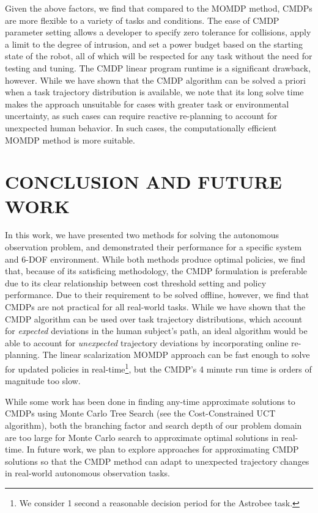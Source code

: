 \documentclass[letterpaper, 10 pt, conference]{ieeeconf}  %
\begin{document}
Given the above factors, we find that compared to the MOMDP method, CMDPs are more flexible to a variety of tasks and conditions.  The ease of CMDP parameter setting allows a developer to specify zero tolerance for collisions, apply a limit to the degree of intrusion, and set a power budget based on the starting state of the robot, all of which will be respected for any task without the need for testing and tuning.  The CMDP linear program runtime is a significant drawback, however.  While we have shown that the CMDP algorithm can be solved a priori when a task trajectory distribution is available, we note that its long solve time makes the approach unsuitable for cases with greater task or environmental uncertainty, as such cases can require reactive re-planning to account for unexpected human behavior.  In such cases, the computationally efficient MOMDP method is more suitable.

\section{CONCLUSION AND FUTURE WORK}
\label{sec:future}
\vspace{-0.1cm}
In this work, we have presented two methods for solving the autonomous observation problem, and demonstrated their performance for a specific system and 6-DOF environment.  While both methods produce optimal policies, we find that, because of its satisficing methodology, the CMDP formulation is preferable due to its clear relationship between cost threshold setting and policy performance.  Due to their requirement to be solved offline, however, we find that CMDPs are not practical for all real-world tasks.  While we have shown that the CMDP algorithm can be used over task trajectory distributions, which account for \textit{expected} deviations in the human subject's path, an ideal algorithm would be able to account for \textit{unexpected} trajectory deviations by incorporating online re-planning.  The linear scalarization MOMDP approach can be fast enough to solve for updated policies in real-time\footnote{We consider 1 second a reasonable decision period for the Astrobee task.}, but the CMDP's 4 minute run time is orders of magnitude too slow.

While some work has been done in finding any-time approximate solutions to CMDPs using Monte Carlo Tree Search (see the Cost-Constrained UCT algorithm\cite{LKPK2018a}), both the branching factor and search depth of our problem domain are too large for Monte Carlo search to approximate optimal solutions in real-time.  In future work, we plan to explore approaches for approximating CMDP solutions so that the CMDP method can adapt to unexpected trajectory changes in real-world autonomous observation tasks.
\end{document}
